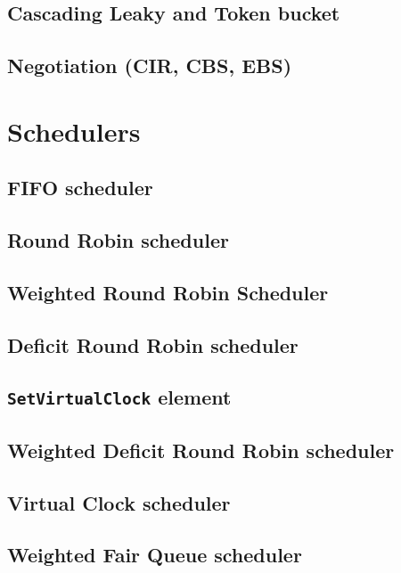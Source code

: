 \documentclass[a4paper]{article}
\begin{document}
  \subsection{Cascading Leaky and Token bucket}
  \subsection{Negotiation (CIR, CBS, EBS)}
  \section{Schedulers}
  \subsection{FIFO scheduler}
  \subsection{Round Robin scheduler}
  \subsection{Weighted Round Robin Scheduler}
  \subsection{Deficit Round Robin scheduler}
  \subsection{\texttt{SetVirtualClock} element}
  \subsection{Weighted Deficit Round Robin scheduler}
  \subsection{Virtual Clock scheduler}
  \subsection{Weighted Fair Queue scheduler}
\end{document}
